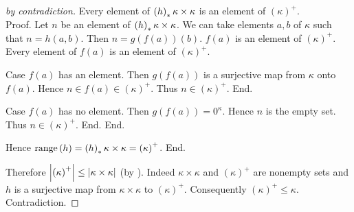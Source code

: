 \documentclass{article}
\newcommand{\constzero}[1]{0^{#1}}
\newcommand{\cardsucc}[1]{\left(#1\right)^{+}}
\begin{document}
\begin{forthel}
\begin{proof}[by contradiction]
        Every element of $\left(h\right)_{*}{\kappa \times \kappa}$ is an element of
        $\cardsucc{\kappa}$. \\
        Proof.
          Let $n$ be an element of $\left(h\right)_{*}{\kappa \times \kappa}$.
          We can take elements $a, b$ of $\kappa$ such that $n = h(a,b)$.
          Then $n = g(f(a))(b)$.
          $f(a)$ is an element of $\cardsucc{\kappa}$.
          Every element of $f(a)$ is an element of $\cardsucc{\kappa}$.

          Case $f(a)$ has an element.
            Then $g(f(a))$ is a surjective map from $\kappa$ onto $f(a)$.
            Hence $n \in f(a) \in \cardsucc{\kappa}$.
            Thus $n \in \cardsucc{\kappa}$.
          End.

          Case $f(a)$ has no element.
            Then $g(f(a)) = \constzero{\kappa}$.
            Hence $n$ is the empty set.
            Thus $n \in \cardsucc{\kappa}$.
          End.
        End.

        Hence $\range{h} = \image{h}{\kappa \times \kappa} = \cardsucc{\kappa}$.
      End.

      Therefore $\card{\cardsucc{\kappa}} \leq \card{\kappa \times \kappa}$
      (by ).
      Indeed $\kappa \times \kappa$ and $\cardsucc{\kappa}$ are nonempty sets and $h$
      is a surjective map from $\kappa \times \kappa$ to $\cardsucc{\kappa}$.
      Consequently $\cardsucc{\kappa} \leq \kappa$.
      Contradiction.
    \end{proof}
  \end{forthel}

  \printbibliography
\end{document}
